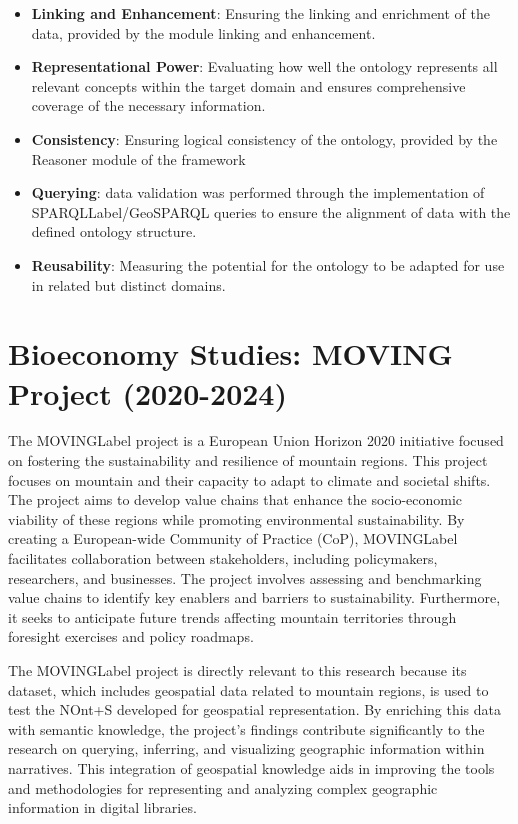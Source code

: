 \begin{itemize}
    \item \textbf{Linking and Enhancement}: Ensuring the linking and enrichment of the data, provided by the module linking and enhancement.
    \item \textbf{Representational Power}: Evaluating how well the ontology represents all relevant concepts within the target domain and ensures comprehensive coverage of the necessary information.
    \item \textbf{Consistency}: Ensuring logical consistency of the ontology, provided by the Reasoner module of the framework
    \item \textbf{Querying}: data validation was performed through the implementation of \acrshort{SPARQLLabel}/GeoSPARQL queries to ensure the alignment of data with the defined ontology structure.
    \item \textbf{Reusability}: Measuring the potential for the ontology to be adapted for use in related but distinct domains.
    
\end{itemize}

\section{Bioeconomy Studies: MOVING Project (2020-2024)}\label{VII-sec:moving}

The \acrfull{MOVINGLabel} project\cite{MOVINGHorizon2020} is a European Union Horizon 2020 initiative focused on fostering the sustainability and resilience of mountain regions. This project focuses on mountain  and their capacity to adapt to climate and societal shifts. The project aims to develop value chains that enhance the socio-economic viability of these regions while promoting environmental sustainability. By creating a European-wide Community of Practice (CoP), \acrshort{MOVINGLabel} facilitates collaboration between stakeholders, including policymakers, researchers, and businesses. The project involves assessing and benchmarking value chains to identify key enablers and barriers to sustainability. Furthermore, it seeks to anticipate future trends affecting mountain territories through foresight exercises and policy roadmaps.

The \acrshort{MOVINGLabel} project is directly relevant to this research because its dataset, which includes geospatial data related to mountain regions, is used to test the NOnt+S developed for geospatial representation. By enriching this data with semantic knowledge, the project’s findings contribute significantly to the research on querying, inferring, and visualizing geographic information within narratives. This integration of geospatial knowledge aids in improving the tools and methodologies for representing and analyzing complex geographic information in digital libraries.

